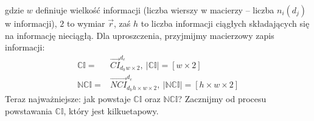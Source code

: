 gdzie $w$ definiuje wielkość informacji (liczba wierszy w macierzy -- liczba $n_{i}(d_j)$ w informacji), 
$2$ to wymiar $\vec{r}$, zaś $h$ to liczba informacji ciągłych składających się na informację nieciągłą.
Dla uproszczenia, przyjmijmy macierzowy zapis informacji:
\begin{equation} \label{eq:def_info_global_matrix}
    \begin{aligned}
        \mathbb{CI} = 
            & \vec{CI}_{d_{b}}^{d_{e}}_{w \times 2}, 
                \: |\mathbb{CI}| = [w \times 2] \\
        \mathbb{NCI} = 
            & \vec{NCI}_{d_{b}}^{d_{e}}_{h \times w \times 2}, 
                \: |\mathbb{NCI}| = [h \times w \times 2]
    \end{aligned}
\end{equation}
Teraz najważniejsze: jak powstaje $\mathbb{CI}$ oraz $\mathbb{NCI}$? Zacznijmy od procesu powstawania 
$\mathbb{CI}$, który jest kilkuetapowy. 
